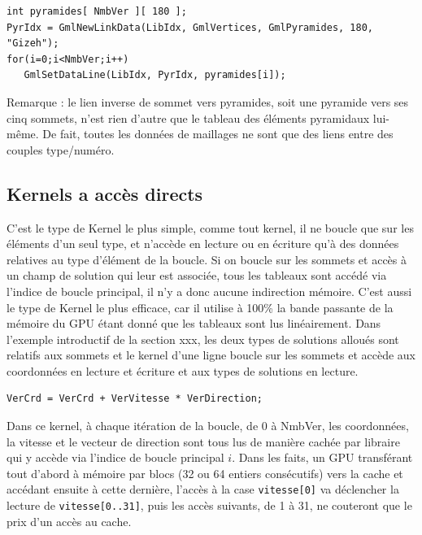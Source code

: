 \documentclass[a4paper,12pt]{article}
\begin{document}
\begin{tt}
\begin{verbatim}
int pyramides[ NmbVer ][ 180 ];
PyrIdx = GmlNewLinkData(LibIdx, GmlVertices, GmlPyramides, 180, "Gizeh");
for(i=0;i<NmbVer;i++)
   GmlSetDataLine(LibIdx, PyrIdx, pyramides[i]);
\end{verbatim}
\end{tt}
\normalfont

Remarque : le lien inverse de sommet vers pyramides, soit une pyramide vers ses cinq sommets, n'est rien d'autre que le tableau des éléments pyramidaux lui-même. De fait, toutes les données de maillages ne sont que des liens entre des couples type/numéro.

\subsection{Kernels a accès directs}
C'est le type de Kernel le plus simple, comme tout kernel, il ne boucle que sur les éléments d'un seul type, et n'accède en lecture ou en écriture qu'à des données relatives au type d'élément de la boucle. Si on boucle sur les sommets et accès à un champ de solution qui leur est associée, tous les tableaux sont accédé via l'indice de boucle principal, il n'y a donc aucune indirection mémoire. C'est aussi le type de Kernel le plus efficace, car il utilise à 100\% la bande passante de la mémoire du GPU étant donné que les tableaux sont lus linéairement.
Dans l'exemple introductif de la section xxx, les deux types de solutions alloués sont relatifs aux sommets et le kernel d'une ligne boucle sur les sommets et accède aux coordonnées en lecture et écriture et aux types de solutions en lecture.

\begin{tt}
\begin{verbatim}
VerCrd = VerCrd + VerVitesse * VerDirection;
\end{verbatim}
\end{tt}
\normalfont

Dans ce kernel, à chaque itération de la boucle, de 0 à NmbVer, les coordonnées, la vitesse et le vecteur de direction sont tous lus de manière cachée par libraire qui y accède via l'indice de boucle principal $i$. Dans les faits, un GPU transférant tout d'abord à mémoire par blocs (32 ou 64 entiers consécutifs) vers la cache et accédant ensuite à cette dernière, l'accès à la case {\tt vitesse[0]} va déclencher la lecture de {\tt vitesse[0..31]}, puis les accès suivants, de 1 à 31, ne couteront que le prix d'un accès au cache.
\end{document}
